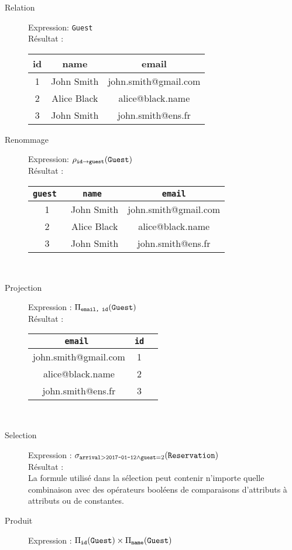 \documentclass{cours}
\begin{document}
\begin{description}
    \item[Relation] Expression: \texttt{Guest}\\
    Résultat : \begin{tabular}{ccc}
        \toprule
        id & name & email\\
        \midrule
        1 & John Smith & john.smith@gmail.com\\
        2 & Alice Black & alice@black.name\\
        3 & John Smith & john.smith@ens.fr\\
        \bottomrule
    \end{tabular}
    \item[Renommage] Expression: $\rho_{\texttt{id}\to\texttt{guest}}(\texttt{Guest})$\\
    Résultat : \begin{tabular}{ccc}
        \toprule
        \tt guest & \tt name & \tt email\\
        \midrule
        1 & John Smith & john.smith@gmail.com\\
        2 & Alice Black & alice@black.name\\
        3 & John Smith & john.smith@ens.fr\\
        \bottomrule
    \end{tabular}\\
    \item[Projection] Expression : $\Pi_{\texttt{email, id}}(\texttt{Guest})$\\
    Résultat : \begin{tabular}{ccc}
        \toprule
        \tt email & \tt id\\
        \midrule
        john.smith@gmail.com & 1\\
        alice@black.name & 2\\
        john.smith@ens.fr & 3\\
        \bottomrule
    \end{tabular}\\
    \item[Selection] Expression : $\sigma_{\texttt{arrival}>\texttt{2017-01-12}\land\texttt{guest}=2}(\texttt{Reservation})$\\
    Résultat : \\
    La formule utilisé dans la sélection peut contenir n'importe quelle combinaison avec des opérateurs booléens de comparaisons d'attributs à attributs ou de constantes.\\
    \item[Produit] Expression : $\Pi_{\texttt{id}}(\texttt{Guest}) \times \Pi_{\texttt{name}}(\texttt{Guest})$\\

\end{description}
\end{document}
